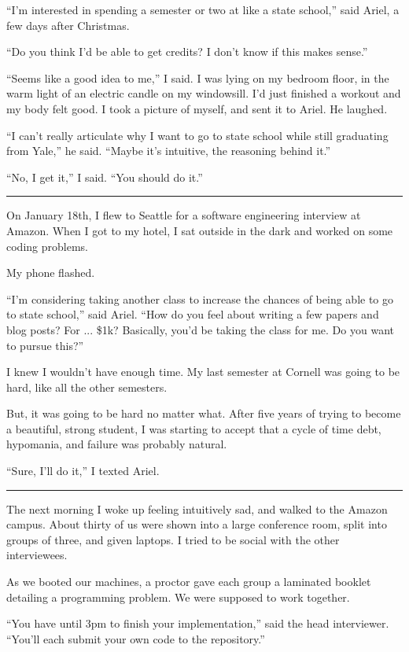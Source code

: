 ``I'm interested in spending a semester or two at like a state school,'' said
Ariel, a few days after Christmas.

``Do you think I'd be able to get credits? I don't know if this makes sense.''

``Seems like a good idea to me,'' I said. I was lying on my bedroom floor, in
the warm light of an electric candle on my windowsill. I'd just finished a
workout and my body felt good. I took a picture of myself, and sent it to Ariel.
He laughed.

``I can't really articulate why I want to go to state school while still
graduating from Yale,'' he said. ``Maybe it's intuitive, the reasoning behind
it.''

``No, I get it,'' I said. ``You should do it.''

\plainfancybreak{12pt}{2}{}

On January 18th, I flew to Seattle for a software engineering interview at
Amazon.  When I got to my hotel, I sat outside in the dark and worked on some
coding problems.

My phone flashed.

``I'm considering taking another class to increase the chances of being able to
go to state school,'' said Ariel.  ``How do you feel about writing a few papers
and blog posts?  For ... \$1k?  Basically, you'd be taking the class for me.  Do
you want to pursue this?''

I knew I wouldn't have enough time.  My last semester at Cornell was going to be
hard, like all the other semesters.

But, it was going to be hard no matter what.  After five years of trying to
become a beautiful, strong student, I was starting to accept that a cycle of
time debt, hypomania, and failure was probably natural.

``Sure, I'll do it,'' I texted Ariel.

\plainfancybreak{12pt}{2}{}

The next morning I woke up feeling intuitively sad, and walked to the Amazon
campus.  About thirty of us were shown into a large conference room, split into
groups of three, and given laptops.  I tried to be social with the other
interviewees.

As we booted our machines, a proctor gave each group a laminated booklet
detailing a programming problem.  We were supposed to work together.

``You have until 3pm to finish your implementation,'' said the head interviewer.
``You'll each submit your own code to the repository.''

